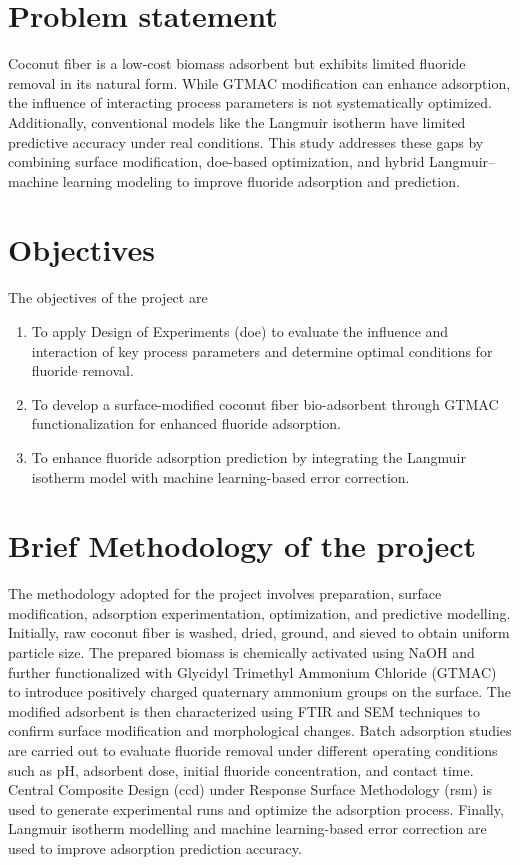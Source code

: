 \section[Problem statement]{\textbf{Problem statement}}

Coconut fiber is a low-cost biomass adsorbent but exhibits limited fluoride removal in its natural form. While GTMAC modification can enhance adsorption, the influence of interacting process parameters is not systematically optimized. Additionally, conventional models like the Langmuir isotherm have limited predictive accuracy under real conditions. This study addresses these gaps by combining surface modification, \gls{doe}-based optimization, and hybrid Langmuir–machine learning modeling to improve fluoride adsorption and prediction.


\section[Objectives]{\textbf{Objectives}}
The objectives of the project are
\begin{enumerate}
\item To apply Design of Experiments (\gls{doe}) to evaluate the influence and interaction of key process parameters and determine optimal conditions for fluoride removal.
\item To develop a surface-modified coconut fiber bio-adsorbent through GTMAC functionalization for enhanced fluoride adsorption.
\item To enhance fluoride adsorption prediction by integrating the Langmuir isotherm model with machine learning-based error correction.
\end{enumerate}

\section[Brief Methodology of the project]{\textbf{Brief Methodology of the project}}
The methodology adopted for the project involves preparation, surface modification, adsorption experimentation, optimization, and predictive modelling. Initially, raw coconut fiber is washed, dried, ground, and sieved to obtain uniform particle size. The prepared biomass is chemically activated using NaOH and further functionalized with Glycidyl Trimethyl Ammonium Chloride (GTMAC) to introduce positively charged quaternary ammonium groups on the surface. The modified adsorbent is then characterized using FTIR and SEM techniques to confirm surface modification and morphological changes. Batch adsorption studies are carried out to evaluate fluoride removal under different operating conditions such as pH, adsorbent dose, initial fluoride concentration, and contact time. Central Composite Design (\gls{ccd}) under Response Surface Methodology (\gls{rsm}) is used to generate experimental runs and optimize the adsorption process. Finally, Langmuir isotherm modelling and machine learning-based error correction are used to improve adsorption prediction accuracy. 

